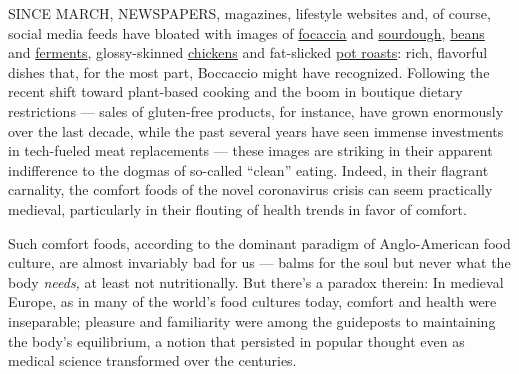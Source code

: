 SINCE MARCH, NEWSPAPERS, magazines, lifestyle websites and, of course,
social media feeds have bloated with images of
\href{https://www.nytimes.com/2020/04/24/dining/focaccia-bread.html}{focaccia}
and
\href{https://www.nytimes.com/2020/04/11/science/sourdough-bread-starter-library.html}{sourdough},
\href{https://www.nytimes.com/2020/03/22/business/coronavirus-beans-sales.html}{beans}
and
\href{https://www.nytimes.com/2020/04/07/realestate/home-farming-tips-coronavirus.html}{ferments},
glossy-skinned
\href{https://www.nytimes.com/2020/07/03/dining/the-most-delicious-chicken.html}{chickens}
and fat-slicked
\href{https://cooking.nytimes.com/recipes/1020845-slow-cooker-pot-roast}{pot
roasts}: rich, flavorful dishes that, for the most part, Boccaccio might
have recognized. Following the recent shift toward plant-based cooking
and the boom in boutique dietary restrictions --- sales of gluten-free
products, for instance, have grown enormously over the last decade,
while the past several years have seen immense investments in
tech-fueled meat replacements --- these images are striking in their
apparent indifference to the dogmas of so-called ``clean'' eating.
Indeed, in their flagrant carnality, the comfort foods of the novel
coronavirus crisis can seem practically medieval, particularly in their
flouting of health trends in favor of comfort.

Such comfort foods, according to the dominant paradigm of Anglo-American
food culture, are almost invariably bad for us --- balms for the soul
but never what the body \emph{needs,} at least not nutritionally. But
there's a paradox therein: In medieval Europe, as in many of the world's
food cultures today, comfort and health were inseparable; pleasure and
familiarity were among the guideposts to maintaining the body's
equilibrium, a notion that persisted in popular thought even as medical
science transformed over the centuries.

